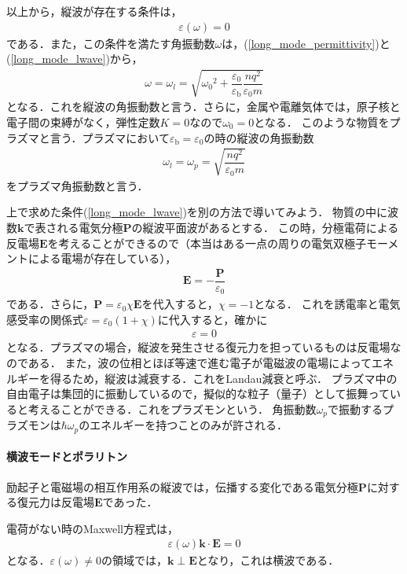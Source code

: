以上から，縦波が存在する条件は，
\begin{align}
  \varepsilon(\omega)=0\label{long_mode_lwave}
\end{align}
である．また，この条件を満たす角振動数$\omega$は，(\ref{long_mode_permittivity})と(\ref{long_mode_lwave})から，
\begin{align}
  \omega=\omega_l=\sqrt{{\omega_0}^2+\dfrac{\varepsilon_0}{\varepsilon_\text{b}}\dfrac{nq^2}{\varepsilon_0m}}
\end{align}
となる．これを縦波の角振動数と言う．さらに，金属や電離気体では，原子核と電子間の束縛がなく，弾性定数$K=0$なので$\omega_0=0$となる．
このような物質をプラズマと言う．プラズマにおいて$\varepsilon_\text{b}=\varepsilon_0$の時の縦波の角振動数
\begin{align}
  \omega_l=\omega_p=\sqrt{\dfrac{nq^2}{\varepsilon_0m}}
\end{align}
をプラズマ角振動数と言う．

上で求めた条件(\ref{long_mode_lwave})を別の方法で導いてみよう．
物質の中に波数$\boldsymbol{k}$で表される電気分極$\boldsymbol{P}$の縦波平面波があるとする．
この時，分極電荷による反電場$\boldsymbol{E}$を考えることができるので（本当はある一点の周りの電気双極子モーメントによる電場が存在している），
\begin{align}
  \boldsymbol{E}=-\dfrac{\boldsymbol{P}}{\varepsilon_0}
\end{align}
である．さらに，$\boldsymbol{P}=\varepsilon_0\chi\boldsymbol{E}$を代入すると，$\chi=-1$となる．
これを誘電率と電気感受率の関係式$\varepsilon=\varepsilon_0(1+\chi)$に代入すると，確かに
\begin{align}
  \varepsilon=0
\end{align}
となる．プラズマの場合，縦波を発生させる復元力を担っているものは反電場なのである．
また，波の位相とほぼ等速で進む電子が電磁波の電場によってエネルギーを得るため，縦波は減衰する．これをLandau減衰と呼ぶ．
プラズマ中の自由電子は集団的に振動しているので，擬似的な粒子（量子）として振舞っていると考えることができる．これをプラズモンという．
角振動数$\omega_p$で振動するプラズモンは$\hbar\omega_p$のエネルギーを持つことのみが許される．

\paragraph{横波モードとポラリトン}
励起子と電磁場の相互作用系の縦波では，伝播する変化である電気分極$\boldsymbol{P}$に対する復元力は反電場$\boldsymbol{E}$であった．

電荷がない時のMaxwell方程式は，
\begin{align}
  \varepsilon(\omega)\boldsymbol{k}\cdot\boldsymbol{E}=0
\end{align}
となる．$\varepsilon(\omega)\neq0$の領域では，$\boldsymbol{k}\perp\boldsymbol{E}$となり，これは横波である．

